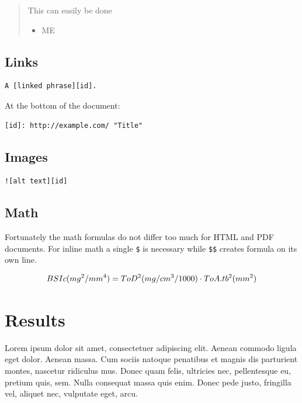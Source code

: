 \documentclass[]{cik}%
\begin{document}
\begin{quote}
This can easily be done

\begin{itemize}
\tightlist
\item
  ME
\end{itemize}
\end{quote}

\hypertarget{links}{%
\subsection{Links}\label{links}}

\begin{verbatim}
A [linked phrase][id].
\end{verbatim}

At the bottom of the document:

\begin{verbatim}
[id]: http://example.com/ "Title"
\end{verbatim}

\hypertarget{images}{%
\subsection{Images}\label{images}}

\begin{verbatim}
![alt text][id]
\end{verbatim}

\hypertarget{math}{%
\subsection{Math}\label{math}}

Fortunately the math formulas do not differ too much for HTML and PDF
documents. For inline math a single \texttt{\$} is necessary while
\texttt{\$\$} creates formula on its own line.

\[
BSIc \space (mg^2/mm^4) = ToD^2 \space (mg/cm^3/1000) \cdot ToA.tb^2 \space (mm^2) \space 
\]

\newpage

\hypertarget{results}{%
\section{Results}\label{results}}

Lorem ipsum dolor sit amet, consectetuer adipiscing elit. Aenean commodo
ligula eget dolor. Aenean massa. Cum sociis natoque penatibus et magnis
dis parturient montes, nascetur ridiculus mus. Donec quam felis,
ultricies nec, pellentesque eu, pretium quis, sem. Nulla consequat massa
quis enim. Donec pede justo, fringilla vel, aliquet nec, vulputate eget,
arcu.
\end{document}

